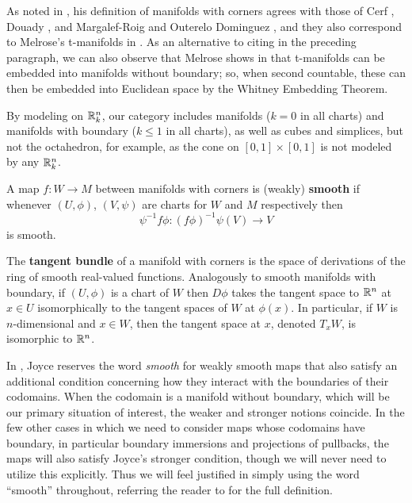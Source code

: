 As noted in \cite[Remark 2.11]{Joy12}, his definition of manifolds with corners agrees with those of Cerf \cite{Ce61}, Douady \cite{Doua61}, and Margalef-Roig and Outerelo Dominguez \cite{MaDo92}, and they also correspond to Melrose's t-manifolds in \cite{Melrose}. 
As an alternative to citing \cite{MaDo92} in the preceding paragraph, we can also observe that Melrose shows in \cite[Proposition 1.14.1]{Melrose} that t-manifolds can be embedded into manifolds without boundary; so, when second countable, these can then be embedded into Euclidean space by the Whitney Embedding Theorem.



By modeling on $\mathbb{R}^n_k$, our category includes manifolds ($k = 0$ in all charts) and manifolds with boundary ($k \leq 1$ in all charts), as well as cubes and simplices, but not the octahedron, for example, as the cone on $[0,1] \times [0,1]$ is not modeled by any $\mathbb{R}^n_k$.

\begin{comment}
	The smooth real-valued functions on a manifold with corners $W$ are those $f$ such that for each chart $\phi \colon U \subset \R^n_k \to W$ the composition $f \circ \phi \colon U \to \R$ is smooth.
\end{comment}

\begin{definition}
	A map $f \colon W \to M$ between manifolds with corners is {(weakly) \bf smooth} if whenever $(U,\phi)$, $(V,\psi)$ are charts for $W$ and $M$ respectively then
	$$\psi^{-1}f \phi \colon (f\phi)^{-1}\psi(V) \to V$$
	is smooth.

	The \textbf{tangent bundle} of a manifold with corners is the space of derivations of the ring of smooth real-valued functions.
	Analogously to smooth manifolds with boundary, if $(U,\phi)$ is a chart of $W$ then $D\phi$ takes the tangent space to $\mathbb{R}^n$ at $x \in U$ isomorphically to the tangent spaces of $W$ at $\phi(x)$.
	In particular, if $W$ is $n$-dimensional and $x \in W$, then the tangent space at $x$, denoted $T_xW$, is isomorphic to $\mathbb{R}^n$.
\end{definition}

In \cite{Joy12}, Joyce reserves the word \textit{smooth} for weakly smooth maps that also satisfy an additional condition concerning how they interact with the boundaries of their codomains.
When the codomain is a manifold without boundary, which will be our primary situation of interest, the weaker and stronger notions coincide.
In the few other cases in which we need to consider maps whose codomains have boundary, in particular boundary immersions and projections of pullbacks, the maps will also satisfy Joyce's stronger condition, though we will never need to utilize this explicitly.
Thus we will feel justified in simply using the word ``smooth'' throughout, referring the reader to \cite[Definition 3.1]{Joy12} for the full definition.

